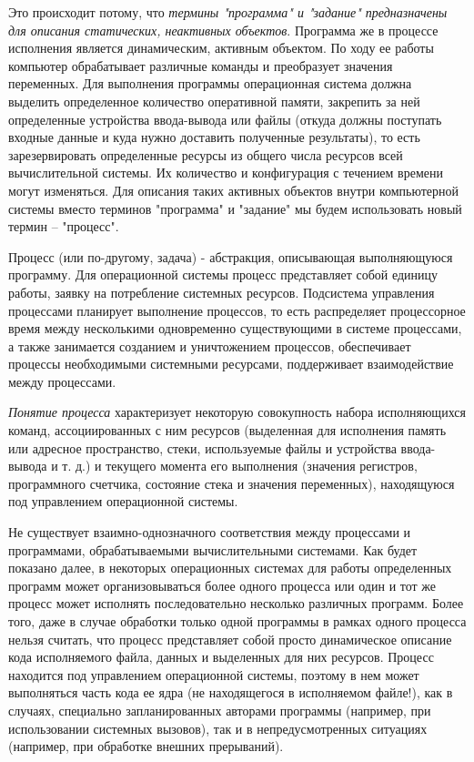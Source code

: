 Это происходит потому, что \textit{термины "программа" и "задание" предназначены для описания статических, неактивных объектов}. Программа же в процессе исполнения является динамическим, активным объектом. По ходу ее работы компьютер обрабатывает различные команды и преобразует значения переменных. Для выполнения программы операционная система должна выделить определенное количество оперативной памяти, закрепить за ней определенные устройства ввода-вывода или файлы (откуда должны поступать входные данные и куда нужно доставить полученные результаты), то есть зарезервировать определенные ресурсы из общего числа ресурсов всей вычислительной системы. Их количество и конфигурация с течением времени могут изменяться. Для описания таких активных объектов внутри компьютерной системы вместо терминов "программа" и "задание" мы будем использовать новый термин – "процесс".

\begin{opr}
   Процесс (или по-другому, задача) - абстракция, описывающая выполняющуюся программу. Для операционной системы процесс представляет собой единицу работы, заявку на потребление системных ресурсов. Подсистема управления процессами планирует выполнение процессов, то есть распределяет процессорное время между несколькими одновременно существующими в системе процессами, а также занимается созданием и уничтожением процессов, обеспечивает процессы необходимыми системными ресурсами, поддерживает взаимодействие между процессами.
\end{opr}

\textit{Понятие процесса} характеризует некоторую совокупность набора исполняющихся команд, ассоциированных с ним ресурсов (выделенная для исполнения память или адресное пространство, стеки, используемые файлы и устройства ввода-вывода и т. д.) и текущего момента его выполнения (значения регистров, программного счетчика, состояние стека и значения переменных), находящуюся под управлением операционной системы.

Не существует взаимно-однозначного соответствия между процессами и программами, обрабатываемыми вычислительными системами. Как будет показано далее, в некоторых операционных системах для работы определенных программ может организовываться более одного процесса или один и тот же процесс может исполнять последовательно несколько различных программ. Более того, даже в случае обработки только одной программы в рамках одного процесса нельзя считать, что процесс представляет собой просто динамическое описание кода исполняемого файла, данных и выделенных для них ресурсов. Процесс находится под управлением операционной системы, поэтому в нем может выполняться часть кода ее ядра (не находящегося в исполняемом файле!), как в случаях, специально запланированных авторами программы (например, при использовании системных вызовов), так и в непредусмотренных ситуациях (например, при обработке внешних прерываний).

